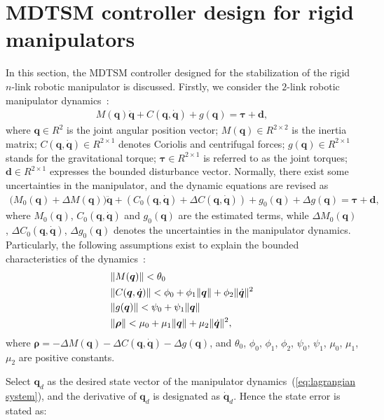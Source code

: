 \documentclass[3p]{elsarticle}
\theoremstyle{plain}
\theoremstyle{remark}
\begin{document}
\section{MDTSM controller design for rigid manipulators}\label{sec:3}
In this section, the MDTSM controller designed for the stabilization of the rigid $n$-link robotic manipulator is discussed. Firstly, we consider the $2$-link robotic manipulator dynamics~\cite{feng2002non}:
\begin{align}
M(\bm q)\ddot {\bm q}+C(\bm q,\dot {\bm q})+g(\bm q)= \bm\tau+{\bm d},\label{eq:lagrangian system}
\end{align}
where $\bm q\in R^{2} $ is the joint angular position vector; ${M(\bm q)}\in R^{2\times 2}$ is the inertia matrix; ${C(\bm q,\dot{\bm q})}\in R^{2\times 1}$ denotes Coriolis and centrifugal forces; ${g(\bm q)}\in R^{2\times 1}$ stands for the gravitational torque; $\bm{\tau}\in R^{2\times 1}$ is referred to as the joint torques; $\bm d\in R^{2\times 1}$ expresses the bounded disturbance vector. Normally, there exist some uncertainties in the manipulator, and the dynamic equations are revised as
\begin{align}
(M_0(\bm q)+\Delta {M(\bm q))\ddot {\bm q}}+({C_0(\bm q,\dot {\bm q})+\Delta C(\bm q,\dot {\bm q})})+g_0(\bm q)+\Delta g(\bm q)=\bm {\tau}+\bm{d},
\end{align}
where $M_0(\bm q)$, $C_0(\bm q,\dot {\bm q})$ and $g_0(\bm q)$ are the estimated terms, while $\Delta M_0(\bm q)$, $\Delta C_0(\bm q,\dot {\bm q})$, $\Delta g_0(\bm q)$ denotes the uncertainties in the manipulator dynamics. Particularly, the following assumptions exist to explain the bounded characteristics of the dynamics~\cite{feng2002non}:
\begin{align}
&\Vert M(\bm q)\Vert< \theta_0\notag\\
&\Vert C(\bm q,\dot {\bm q})\Vert< \phi_0+\phi_1\Vert\bm q\Vert+\phi_2\Vert\dot{\bm q}\Vert^2\notag\\
&\Vert g(\bm q)\Vert< \psi_0+\psi_1\Vert\bm q\notag\Vert\\
&\Vert \bm {\rho}\Vert< \mu_0+\mu_1\Vert\bm q\Vert+\mu_2\Vert\dot{\bm q}\Vert^2,\label{eq:manipulator uncertainty}
\end{align}
where $\bm {\rho} = -\Delta M(\bm q)-\Delta C(\bm q,\dot {\bm q})-\Delta g(\bm q)$, and $\theta_0$, $\phi_0$, $\phi_1$, $\phi_2$, $\psi_0$, $\psi_1$, $\mu_0$, $\mu_1$, $\mu_2$ are positive constants.\par
Select $\bm q_d$ as the desired state vector of the manipulator dynamics~(\ref{eq:lagrangian system}), and the derivative of $\bm q_d$ is designated as $\dot {\bm q}_d$. Hence the state error is stated as:
\end{document}
